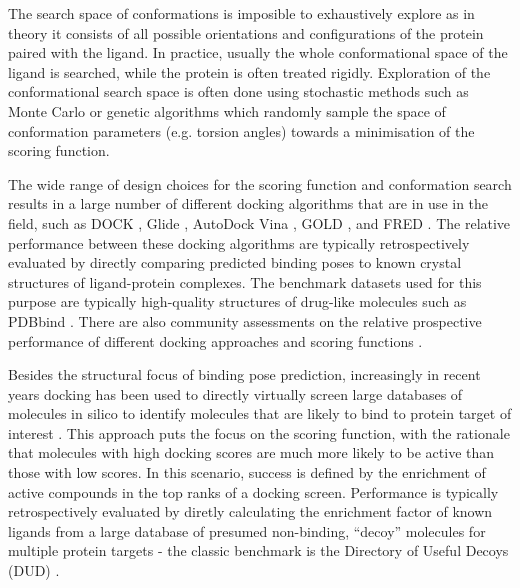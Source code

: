 The search space of conformations is imposible to exhaustively explore as in theory it consists of all possible orientations and configurations of the protein paired with the ligand. In practice, usually the whole conformational space of the ligand is searched, while the protein is often treated rigidly. Exploration of the conformational search space is often done using stochastic methods such as Monte Carlo or genetic algorithms which randomly sample the space of conformation parameters (e.g. torsion angles) towards a minimisation of the scoring function.

The wide range of design choices for the scoring function and conformation search results in a large number of different docking algorithms that are in use in the field, such as DOCK \cite{Coleman2013DOCK}, Glide \cite{friesner2004glide}, AutoDock Vina \cite{Eberhardt2021Vina}, GOLD \cite{Verdonk2003Gold}, and FRED \cite{McGann2012FRED}. The relative performance between these docking algorithms are typically retrospectively evaluated by directly comparing predicted binding poses to known crystal structures of ligand-protein complexes. The benchmark datasets used for this purpose are typically high-quality structures of drug-like molecules such as PDBbind \cite{Wang2004PDBbind,Liu2014PDBbind}. There are also community assessments on the relative prospective performance of different docking approaches \cite{Parks2020D3R} and scoring functions \cite{Su2019CASF}.

Besides the structural focus of binding pose prediction, increasingly in recent years docking has been used to directly virtually screen large databases of molecules in silico to identify molecules that are likely to bind to protein target of interest \cite{Bender2021LargeScaleDocking}. This approach puts the focus on the scoring function, with the rationale that molecules with high docking scores are much more likely to be active than those with low scores. In this scenario, success is defined by the enrichment of active compounds in the top ranks of a docking screen. Performance is typically retrospectively evaluated by diretly calculating the enrichment factor of known ligands from a large database of presumed non-binding, “decoy” molecules for multiple protein targets - the classic benchmark is the Directory of Useful Decoys (DUD) \cite{Huang2006DUD, Mysinger2012DUDE}.

